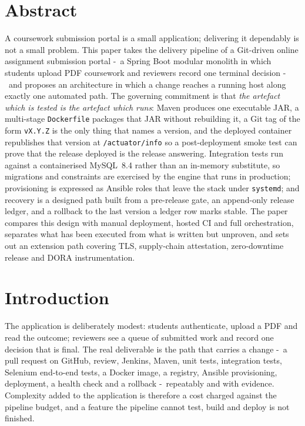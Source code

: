 \documentclass[10pt,a4paper]{article}
\begin{document}
\newpage

\section*{Abstract}

A coursework submission portal is a small application; delivering it dependably is not a small
problem. This paper takes the delivery pipeline of a Git-driven online assignment submission
portal -\ a Spring Boot modular monolith in which students upload PDF coursework and
reviewers record one terminal decision -\ and proposes an architecture in which a
change reaches a running host along exactly one automated path. The governing commitment is that
\emph{the artefact which is tested is the artefact which runs}: Maven produces one executable
JAR, a multi-stage \texttt{Dockerfile} packages that JAR without rebuilding it, a Git tag of the
form \texttt{vX.Y.Z} is the only thing that names a version, and the deployed container
republishes that version at \texttt{/actuator/info} so a post-deployment smoke test can prove
that the release deployed is the release answering. Integration tests run against a containerised
MySQL~8.4 rather than an in-memory substitute, so migrations and constraints are exercised by the
engine that runs in production; provisioning is expressed as Ansible roles that leave the stack
under \texttt{systemd}; and recovery is a designed path built from a pre-release gate, an
append-only release ledger, and a rollback to the last version a ledger row marks stable. The
paper compares this design with manual deployment, hosted CI and full orchestration, separates
what has been executed from what is written but unproven, and sets out an extension path covering
TLS, supply-chain attestation, zero-downtime release and DORA instrumentation.

\section{Introduction}

The application is deliberately modest: students authenticate, upload a PDF and read the outcome;
reviewers see a queue of submitted work and record one decision that is final. The real
deliverable is the path that carries a change -\ a pull request on GitHub, review,
Jenkins, Maven, unit tests, integration tests, Selenium end-to-end tests, a Docker image, a
registry, Ansible provisioning, deployment, a health check and a rollback -\ repeatably
and with evidence. Complexity added to the application is therefore a cost charged against the
pipeline budget, and a feature the pipeline cannot test, build and deploy is not finished.
\end{document}
